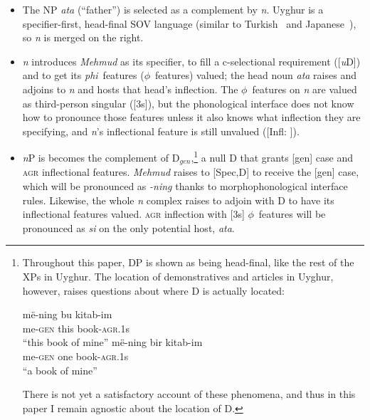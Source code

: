 \documentclass[letterpaper,12pt]{article}
\newcommand{\poss}[2]{\textsc{agr}.{\footnotesize #1}#2}
\newcommand{\posst}{\textsc{agr}}
\newcommand{\gen}{\textsc{gen}}
\begin{document}
\begin{itemize}
	\item The NP \textsl{ata} (``father'') is selected as a complement by \textit{n}. Uyghur is a specifier-first, head-final SOV language (similar to
	Turkish~\cite[p. 233]{vandeCraats} and Japanese~\cite{Koizumi,FukuiSakai}), so \textit{n} is merged on the right.
	\item \textit{n} introduces \textsl{Mehmud} as its specifier, to fill a c-selectional requirement ([\emph{u}D]) and to get its \mbox{\textit{phi} features} \mbox{($\phi$ features)} valued; the head
	noun \textsl{ata} raises and adjoins to \textit{n} and hosts that head's inflection. The \mbox{$\phi$ features} on \textit{n} are valued as third-person singular ([3s]), but the phonological interface does not know how to pronounce those features unless it also knows what inflection they are
	specifying, and \emph{n}'s inflectional feature is still unvalued ([Infl: ]).
	\item \textit{n}P is becomes the complement of D$_{gen}$,\footnote{Throughout this paper, DP is shown as being head-final, like the rest of the XPs in Uyghur.
	The location of demonstratives and articles in Uyghur, however, raises questions about where D is actually located:
	\begin{exe}
	\ex \gll m\"e-ning bu kitab-im\\
						 me-\gen{} this book-\poss{1}{s}\\
			\glt ``this book of mine''
	\ex \gll m\"e-ning bir kitab-im\\
					 me-\gen{} one book-\poss{1}{s}\\
			\glt ``a book of mine''
	\end{exe}
	There is not yet a satisfactory account of these phenomena, and thus in this paper I remain agnostic about the location of D.
	} a null D that grants [gen] case and \posst{} inflectional features. \textsl{Mehmud} raises to [Spec,D] to receive the [gen] case, which will be pronounced as \textsl{-ning} thanks to morphophonological interface rules. Likewise, the whole \textit{n} complex raises to adjoin with D to have its inflectional features valued. \posst{} inflection with [3s] \mbox{$\phi$ features} will
	be pronounced as \textsl{si} on the only potential host, \textsl{ata}.
\end{itemize}
\end{document}
